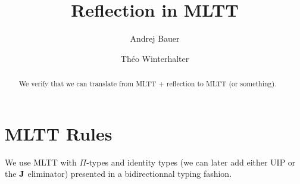 \documentclass{amsart}
\begin{document}
\title{Reflection in MLTT}

\author{Andrej Bauer}
\address{Andrej Bauer\\University of Ljubljana\\Slovenia}

\author{Théo Winterhalter}
\address{Théo Winterhalter\\ENS Cachan, Université Paris-Saclay\\France}

\begin{abstract}
  We verify that we can translate from MLTT + reflection to MLTT (or something).
\end{abstract}

\maketitle

\section{MLTT Rules}

We use MLTT with $\Pi$-types and identity types (we can later add either UIP
or the $\operatorname{\mathbf{J}}$ eliminator) presented in a bidirectionnal typing fashion.


\begin{mathc}
  \ru{}{\der \cdot}
  \qquad
  \qquad
\end{mathc}


\begin{mathc}
  \qquad
\end{mathc}


\begin{mathc}
  \qquad
\end{mathc}
\end{document}
